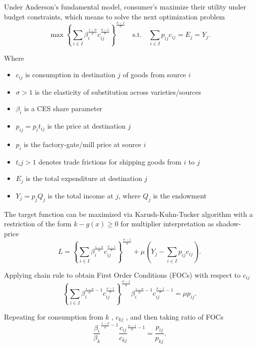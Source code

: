\documentclass[12pt,reqno,oneside,pdftex]{formato-puc/puctesis} %
\providecommand{\tightlist}{%
  \setlength{\itemsep}{0pt}\setlength{\parskip}{0pt}}
\begin{document}
Under Anderson's fundamental model, consumer's maximize their utility
under budget constraints, which means to solve the next optimization
problem \begin{equation*}
\max \left\{ \sum_{i\in I} \beta_i^{\frac{1 - \sigma}{\sigma}} c_{ij}^{\frac{\sigma - 1}{\sigma}} \right\}^{\frac{\sigma - 1}{\sigma}} \quad \text{s.t.} \quad \sum_{i \in I} p_{ij} c_{ij} = E_j = Y_j.
\end{equation*}

Where

\begin{itemize}
\tightlist
\item
  \(c_{ij}\) is consumption in destination \(j\) of goods from source
  \(i\)
\item
  \(\sigma > 1\) is the elasticity of substitution across
  varieties/sources
\item
  \(\beta_i\) is a CES share parameter
\item
  \(p_{ij} = p_i t_{ij}\) is the price at destination \(j\)
\item
  \(p_i\) is the factory-gate/mill price at source \(i\)
\item
  \(t_ij > 1\) denotes trade frictions for shipping goods from \(i\) to
  \(j\)
\item
  \(E_j\) is the total expenditure at destination \(j\)
\item
  \(Y_j = p_j Q_j\) is the total income at \(j\), where \(Q_j\) is the
  endowment
\end{itemize}

The target function can be maximized via Karush-Kuhn-Tucker algorithm
with a restriction of the form \(k - g(x) \geq 0\) for multiplier
interpretation as shadow-price \begin{equation*}
L = \left\{ \sum_{i\in I} \beta_i^{\frac{1 - \sigma}{\sigma}} c_{ij}^{\frac{\sigma - 1}{\sigma}} \right\}^{\frac{\sigma - 1}{\sigma}} + \mu \left( Y_j - \sum_{i \in I} p_{ij} c_{ij} \right).
\end{equation*}

Applying chain rule to obtain First Order Conditions (FOCs) with respect
to \(c_{ij}\) \begin{equation*}
\left\{ \sum_{i\in I} \beta_i^{\frac{1 - \sigma}{\sigma} - 1} c_{ij}^{\frac{\sigma - 1}{\sigma}} \right\}^{\frac{\sigma - 1}{\sigma}} \beta_i^{\frac{1 - \sigma}{\sigma} - 1} c_{ij}^{\frac{\sigma - 1}{\sigma} - 1} = \mu p_{ij}.
\end{equation*}

Repeating for consumption from \(k\) , \(c_{kj}\) , and then taking
ratio of FOCs \begin{equation*}
\frac{\beta_i}{\beta_k}^{\frac{1 - \sigma}{\sigma} - 1} \frac{c_{ij}}{c_{kj}}^{\frac{\sigma - 1}{\sigma} - 1} = \frac{p_{ij}}{p_{kj}}.
\end{equation*}
\end{document}

